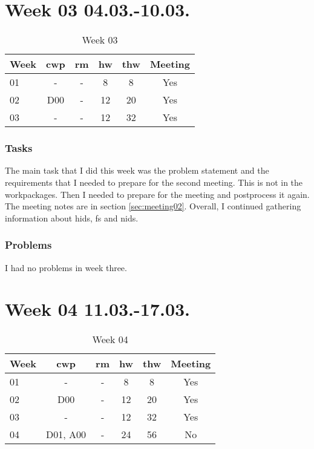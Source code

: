 \section{Week 03 04.03.-10.03.}
\label{sec:journal:week03}
\begin{table}[!ht]
    \begin{center}
        \caption{Week 03}
        \label{tab:journal:week03}
        \begin{tabular}{l|c|c|c|c|c}
            \textbf{Week} & \textbf{\gls{cwp}} & \textbf{\gls{rm}} & \textbf{\gls{hw}} & \textbf{\gls{thw}} & \textbf{Meeting}\\
        \hline
        01 & - & - & 8 & 8 & Yes \\
        02 & D00 & - & 12 & 20 & Yes \\
        03 & - & - & 12 & 32 & Yes \\
        \end{tabular}
    \end{center}
\end{table}

\subsubsection{Tasks}

The main task that I did this week was the problem statement and the requirements that I needed to prepare for the second meeting. This is not in the workpackages. Then I needed to prepare for the meeting and postprocess it again. The meeting notes are in section \ref{sec:meeting02}. Overall, I continued gathering information about \gls{hids}, \gls{fs} and \gls{nids}.

\subsubsection{Problems}

I had no problems in week three.

\section{Week 04 11.03.-17.03.}
\label{sec:journal:week04}

\begin{table}[!ht]
    \begin{center}
        \caption{Week 04}
        \label{tab:journal:week04}
        \begin{tabular}{l|c|c|c|c|c}
            \textbf{Week} & \textbf{\gls{cwp}} & \textbf{\gls{rm}} & \textbf{\gls{hw}} & \textbf{\gls{thw}} & \textbf{Meeting}\\
        \hline
        01 & - & - & 8 & 8 & Yes \\
        02 & D00 & - & 12 & 20 & Yes \\
        03 & - & - & 12 & 32 & Yes \\
        04 & D01, A00 & - & 24 & 56 & No \\
        \end{tabular}
    \end{center}
\end{table}

